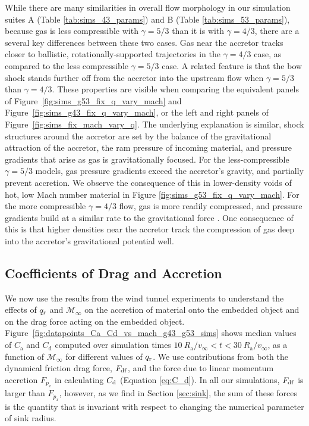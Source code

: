 While there are many similarities in overall flow morphology in our simulation suites A (Table \ref{tab:sims_43_params}) and B (Table \ref{tab:sims_53_params}), because gas is less compressible with $\gamma=5/3$ than it is with $\gamma=4/3$, there are a several key differences between these two cases.   Gas near the accretor tracks closer to ballistic, rotationally-supported trajectories in the $\gamma = 4/3$ case, as compared to the less compressible $\gamma = 5/3$ case. A related feature is that the bow shock stands further off from the accretor into the upstream flow when  $\gamma = 5/3$  than $\gamma=4/3$. These properties are visible when comparing the equivalent panels of Figure~\ref{fig:sims_g53_fix_q_vary_mach} and Figure~\ref{fig:sims_g43_fix_q_vary_mach}, or the left and right panels of Figure~\ref{fig:sims_fix_mach_vary_q}.  The underlying explanation is similar, shock structures around the accretor are set by the balance of the gravitational attraction of the accretor, the ram pressure of incoming material, and pressure gradients that arise as gas is gravitationally focused.  For the less-compressible $\gamma=5/3$ models, gas pressure gradients exceed the accretor's gravity, and partially prevent accretion. We observe the consequence of this in lower-density voids of hot, low Mach number material in Figure \ref{fig:sims_g53_fix_q_vary_mach}. For the more compressible $\gamma = 4/3$ flow, gas is more readily compressed, and pressure gradients build at a similar rate to the gravitational force \cite{Murguia-Berthier:2017}. One consequence of this is that higher densities near the accretor track the compression of gas deep into the accretor's gravitational potential well.

\vspace{2.5mm}
\subsection{Coefficients of Drag and Accretion}\label{sec:coeff}

We now use the results from the wind tunnel experiments to understand the effects of $q_{\rm r}$ and $\mathcal{M}_\infty$ on the accretion of material onto the embedded object and on the drag force acting on the embedded object. 
Figure~\ref{fig:datapoints_Ca_Cd_vs_mach_g43_g53_sims} shows median values of $C_{\mathrm a}$ and $C_{\mathrm d}$ computed over simulation times $10~R_{\mathrm{a}}/v_\infty < t < 30~R_{\mathrm{a}}/v_\infty$, as a function of $\mathcal{M}_\infty$ for different values of $q_{\rm r}$. We use contributions from both the dynamical friction drag force, $F_{\rm{df}}$, and the force due to linear momentum accretion $F_{\dot p_x}$ in calculating $C_{\rm d}$ (Equation \ref{eq:C_d}). In all our simulations, $F_{\rm{df}}$ is larger than $F_{\dot p_x}$, however, as we find in Section \ref{sec:sink}, the sum of these forces is the quantity that is invariant with respect to changing the numerical parameter of sink radius.

